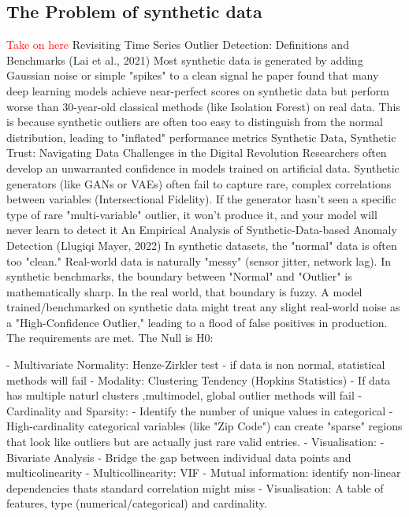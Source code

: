 \subsection{The Problem of synthetic data}
\textcolor{red}{ Take on here }
    Revisiting Time Series Outlier Detection: Definitions and Benchmarks (Lai et al., 2021)
        Most synthetic data is generated by adding Gaussian noise or simple "spikes" to a clean signal
        he paper found that many deep learning models achieve near-perfect scores on synthetic data but perform worse than 30-year-old classical methods (like Isolation Forest) on real data. 
        This is because synthetic outliers are often too easy to distinguish from the normal distribution, leading to "inflated" performance metrics
    Synthetic Data, Synthetic Trust: Navigating Data Challenges in the Digital Revolution
        Researchers often develop an unwarranted confidence in models trained on artificial data.
        Synthetic generators (like GANs or VAEs) often fail to capture rare, complex correlations between variables (Intersectional Fidelity). 
        If the generator hasn't seen a specific type of rare "multi-variable" outlier, it won't produce it, and your model will never learn to detect it
    An Empirical Analysis of Synthetic-Data-based Anomaly Detection (Llugiqi  Mayer, 2022)
        In synthetic datasets, the "normal" data is often too "clean."
        Real-world data is naturally "messy" (sensor jitter, network lag). In synthetic benchmarks, the boundary between "Normal" and "Outlier" is mathematically sharp. 
        In the real world, that boundary is fuzzy.
        A model trained/benchmarked on synthetic data might treat any slight real-world noise as a "High-Confidence Outlier," leading to a flood of false positives in production.
The requirements are met.
The Null is H0: 


   
            - Multivariate Normality: Henze-Zirkler test - if data is non normal, statistical methods will fail
            - Modality: Clustering Tendency (Hopkins Statistics) - If data has multiple naturl clusters ,multimodel, global outlier methods will fail 
        - Cardinality and Sparsity:
            - Identify the number of unique values in categorical - High-cardinality categorical variables (like "Zip Code") can create "sparse" 
                regions that look like outliers but are actually just rare valid entries.
            - Visualisation: 
        - Bivariate Analysis
            - Bridge the gap between individual data points and multicolinearity
            - Multicollinearity: VIF
            - Mutual information: identify non-linear dependencies thats standard correlation might miss
       - Visualisation: A table of features, type (numerical/categorical) and cardinality.



